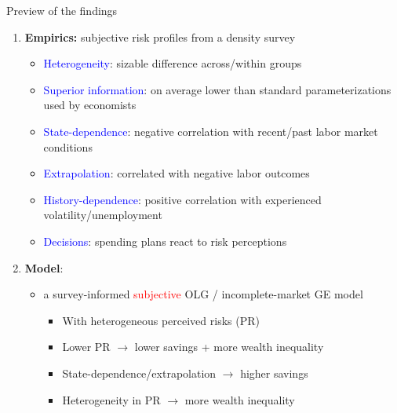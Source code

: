 \documentclass{beamer}
\begin{document}
\begin{frame}{Preview of the findings}
	\begin{enumerate}
		\item \textbf{Empirics:} subjective risk profiles from a density survey
		\begin{itemize}
			\item \textcolor{blue}{Heterogeneity}: sizable difference across/within groups
			\item \textcolor{blue}{Superior information}: on average lower than standard parameterizations used by economists 
			\item \textcolor{blue}{State-dependence}: negative correlation with recent/past labor market conditions 
				\item \textcolor{blue}{Extrapolation}:  correlated with negative labor outcomes
			\item \textcolor{blue}{History-dependence}: positive correlation with experienced volatility/unemployment 
			\item \textcolor{blue}{Decisions}: spending plans react to risk perceptions
			

		
		\end{itemize}
\pause
		\item \textbf{Model}: 
		\begin{itemize}
			\item a survey-informed \textcolor{red}{subjective} OLG / incomplete-market GE model 
\begin{itemize}
	\item With heterogeneous perceived risks (PR)
	\item Lower PR $\rightarrow$ lower savings + more wealth inequality 
	\item State-dependence/extrapolation $\rightarrow$ higher savings
	\item Heterogeneity in PR $\rightarrow$ more wealth inequality 
\end{itemize}
		\end{itemize} 
	\end{enumerate}
\end{frame}
\end{document}
